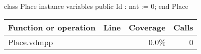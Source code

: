 \begin{vdmpp}
class Place
instance variables
 public Id : nat := 0;
end Place
\end{vdmpp}
\bigskip
\begin{longtable}{|l|r|r|r|}
\hline
Function or operation & Line & Coverage & Calls \\
\hline
\hline
\hline
Place.vdmpp & & 0.0\% & 0 \\
\hline
\end{longtable}

